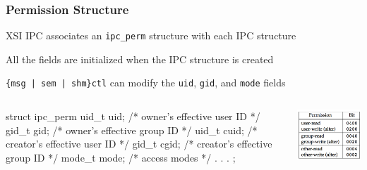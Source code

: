 \documentclass[newPxFont,sthlmFooter,nooffset]{beamer}
\begin{document}
\begin{frame}[t, fragile]
  \frametitle{Permission Structure}
XSI IPC associates an \texttt{ipc\_perm} structure with each IPC structure

All the fields are initialized when the IPC structure is created

\texttt{\{msg | sem | shm\}ctl} can modify the \texttt{uid}, \texttt{gid}, and \texttt{mode} fields



\begin{columns}
  \begin{column}{0.7\textwidth}
\begin{codedefnb}
struct ipc_perm {
     uid_t  uid;  /* owner’s effective user ID */
     gid_t  gid;  /* owner’s effective group ID */
     uid_t  cuid; /* creator’s effective user ID */
     gid_t  cgid; /* creator’s effective group ID */
     mode_t mode; /* access modes */
     .
     .
     .
};
\end{codedefnb}
  \end{column}
  \begin{column}{0.3\textwidth}
\includegraphics[width=\linewidth]{figures/fig15_24-xsi.png}
  \end{column}
\end{columns}
\end{frame}
\end{document}
